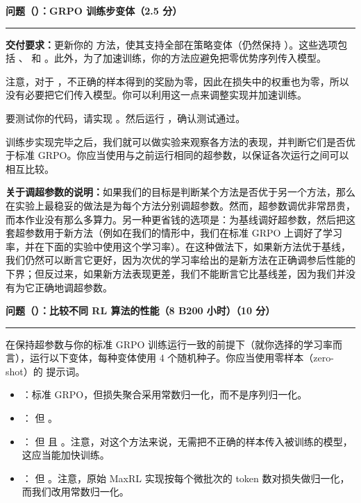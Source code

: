 \medskip
\noindent\textbf{问题（）：GRPO 训练步变体（2.5 分）}
\par\nobreak\smallskip\hrule\nobreak\medskip

\textbf{交付要求：}更新你的  方法，使其支持全部在策略变体（仍然保持 ）。这些选项包括 、 和 。此外，为了加速训练，你的方法应避免把零优势序列传入模型。

注意，对于 ，不正确的样本得到的奖励为零，因此在损失中的权重也为零，所以没有必要把它们传入模型。你可以利用这一点来调整实现并加速训练。

要测试你的代码，请实现 。然后运行 ，确认测试通过。

训练步实现完毕之后，我们就可以做实验来观察各方法的表现，并判断它们是否优于标准 GRPO。你应当使用与之前运行相同的超参数，以保证各次运行之间可以相互比较。

\medskip
\noindent\textbf{关于调超参数的说明：}如果我们的目标是判断某个方法是否优于另一个方法，那么在实验上最稳妥的做法是为每个方法分别调超参数。然而，超参数调优非常昂贵，而本作业没有那么多算力。另一种更省钱的选项是：为基线调好超参数，然后把这套超参数用于新方法（例如在我们的情形中，我们在标准 GRPO 上调好了学习率，并在下面的实验中使用这个学习率）。在这种做法下，如果新方法优于基线，我们仍然可以断言它更好，因为次优的学习率给出的是新方法在正确调参后性能的下界；但反过来，如果新方法表现更差，我们不能断言它比基线差，因为我们并没有为它正确地调超参数。

\medskip
\noindent\textbf{问题（）：比较不同 RL 算法的性能（8 B200 小时）（10 分）}
\par\nobreak\smallskip\hrule\nobreak\medskip

在保持超参数与你的标准 GRPO 训练运行一致的前提下（就你选择的学习率而言），运行以下变体，每种变体使用 4 个随机种子。你应当使用零样本（zero-shot）的  提示词。
\begin{itemize}
  \item {}：标准 GRPO，但损失聚合采用常数归一化，而不是序列归一化。
  \item {}： 但 。
  \item {}： 但  且 。注意，对这个方法来说，无需把不正确的样本传入被训练的模型，这应当能加快训练。
  \item {}： 但 。注意，原始 MaxRL 实现按每个微批次的 token 数对损失做归一化，而我们改用常数归一化。
\end{itemize}

